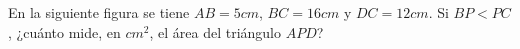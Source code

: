 En la siguiente figura se tiene $AB = 5 cm$, $BC = 16 cm$ y $DC = 12 cm$. Si $BP \lt PC$, ¿cuánto mide, en $cm^2$, el área del triángulo $APD$?